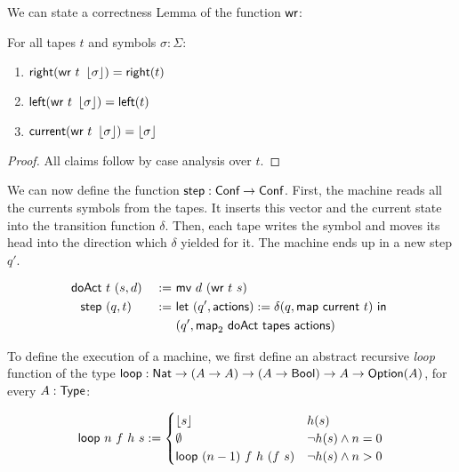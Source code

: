 We can state a correctness Lemma of the function $\MS{wr}$:

\begin{lemma}[Correctness of $\MS{wr}$]
  \label{lem:write}
  For all tapes $t$ and symbols $\sigma:\Sigma$:
  \begin{enumerate}
  \item $\textsf{right}   (\textsf{wr}~t~\left\lfloor {\sigma}\right\rfloor) = \textsf{right}(t)$
  \item $\textsf{left}    (\textsf{wr}~t~\left\lfloor {\sigma}\right\rfloor) = \textsf{left} (t)$
  \item $\textsf{current} (\textsf{wr}~t~\left\lfloor {\sigma}\right\rfloor) = \left\lfloor {\sigma}\right\rfloor$
  \end{enumerate}
\end{lemma}
\begin{proof}
  All claims follow by case analysis over $t$.
\end{proof}

We can now define the function $\textsf{step} : \textsf{Conf} \rightarrow \textsf{Conf}$.  First, the machine reads all the currents symbols from the tapes.  It
inserts this vector and the current state into the transition function $\delta$.  Then, each tape writes the symbol and moves its head into the
direction which $\delta$ yielded for it.  The machine ends up in a new step $q'$.

\begin{definition}[$\MS{step}$]
  \label{def:step}
  \begin{alignat*}{2}
    \textsf{doAct} &~t~(s, d) &~:=~& \textsf{mv}~d~(\textsf{wr}~t~s) \\
    \textsf{step}  &~(q, t)   &~:=~& \textsf{let}~(q', \textsf{actions}) := \delta(q, \textsf{map}~\textsf{current}~t)~\textsf{in}~ \\
               &          &~  ~& (q', \textsf{map}_2~\textsf{doAct}~\textsf{tapes}~\textsf{actions})
  \end{alignat*}
\end{definition}

To define the execution of a machine, we first define an abstract recursive \emph{loop} function of the type
$\textsf{loop} : \textsf{Nat} \rightarrow (A \rightarrow A) \rightarrow (A \rightarrow \textsf{Bool}) \rightarrow A \rightarrow \textsf{Option}(A)$, for every $A:\textsf{Type}$:

\begin{definition}[$\MS{loop}$]
  \begin{align*}
    \textsf{loop}~n~f~h~s :=
    \begin{cases}
      \left\lfloor {s}\right\rfloor                   & h(s) \\
      \emptyset                      & \lnot h(s) \land n = 0 \\
      \textsf{loop}~(n-1)~f~h~(f~s)  & \lnot h(s) \land n > 0
    \end{cases}
  \end{align*}
\end{definition}

